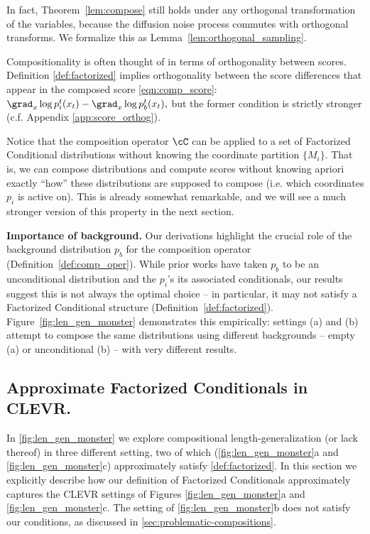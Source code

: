 \begin{remark}
In fact, Theorem~\ref{lem:compose} still holds under any orthogonal transformation of the variables,
because the diffusion noise process commutes with orthogonal transforms.
We formalize this as Lemma~\ref{lem:orthogonal_sampling}.
\end{remark}

\begin{remark}
Compositionality is often thought of in terms of orthogonality between scores.
Definition \ref{def:factorized} implies orthogonality between the score differences that appear in the composed score \eqref{eqn:comp_score}:
$\grad_x \log p_i^t(x_t) - \grad_x \log p_b^t(x_t),$
but the former condition is strictly stronger
(c.f. Appendix \ref{app:score_orthog}).
\end{remark}

\begin{remark}
Notice that the composition operator $\cC$
can be applied to a set of Factorized Conditional
distributions
without knowing the coordinate partition $\{M_i\}$.
That is, we can compose distributions and compute scores
without knowing apriori exactly ``how'' these distributions are supposed to compose
(i.e. which coordinates $p_i$ is active on).
This is already somewhat remarkable, and we will see a much
stronger version of this property in the next section.
\end{remark}

\textbf{Importance of background.}
Our derivations highlight the crucial role of the background
distribution $p_b$ for the composition operator  
(Definition~\ref{def:comp_oper}).
While prior works have taken $p_b$ to be an unconditional distribution and the $p_i$'s its associated conditionals,
our results suggest this is not always the optimal choice -- in particular,
it may not satisfy a Factorized Conditional structure (Definition~\ref{def:factorized}). Figure~\ref{fig:len_gen_monster} demonstrates this empirically: settings (a) and (b) attempt to compose the same distributions using different backgrounds -- empty (a) or unconditional (b) -- with very different results.

\subsection{Approximate Factorized Conditionals in CLEVR.}
\label{sec:clevr-details}

In \cref{fig:len_gen_monster} we explore compositional length-generalization (or lack thereof) in three different setting, two of which (\cref{fig:len_gen_monster}a and \ref{fig:len_gen_monster}c) approximately satisfy \cref{def:factorized}. In this section we explicitly describe how our definition of Factorized Conditionals approximately captures the CLEVR settings of Figures \ref{fig:len_gen_monster}a and \ref{fig:len_gen_monster}c. The setting of \ref{fig:len_gen_monster}b does not satisfy our conditions, as discussed in \cref{sec:problematic-compositions}.

